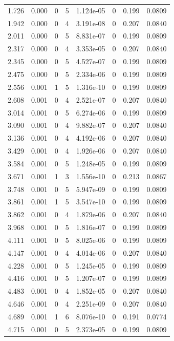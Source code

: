 \documentclass[preview]{standalone}
\begin{document}
{{\begin{tabular}{L{1.2cm}C{1.2cm} C{0.3cm}C{0.5cm} C{1.4cm}C{1.4cm} C{1.4cm}C{1.4cm}}
  1.726  &  0.000  & 0     &  5 &  1.124e-05  & 0  & 0.199 &  0.0809   \\ 
  1.942  &  0.000  & 0     &  4 &  3.191e-08  & 0  & 0.207 &  0.0840   \\ 
  2.011  &  0.000  & 0     &  5 &  8.831e-07  & 0  & 0.199 &  0.0809   \\ 
  2.317  &  0.000  & 0     &  4 &  3.353e-05  & 0  & 0.207 &  0.0840   \\ 
  2.345  &  0.000  & 0     &  5 &  4.527e-07  & 0  & 0.199 &  0.0809   \\ 
  2.475  &  0.000  & 0     &  5 &  2.334e-06  & 0  & 0.199 &  0.0809   \\ 
  2.556  &  0.001  & 1     &  5 &  1.316e-10  & 0  & 0.199 &  0.0809   \\ 
  2.608  &  0.001  & 0     &  4 &  2.521e-07  & 0  & 0.207 &  0.0840   \\ 
  3.014  &  0.001  & 0     &  5 &  6.274e-06  & 0  & 0.199 &  0.0809   \\ 
  3.090  &  0.001  & 0     &  4 &  9.882e-07  & 0  & 0.207 &  0.0840   \\ 
  3.136  &  0.001  & 0     &  4 &  4.192e-06  & 0  & 0.207 &  0.0840   \\ 
  3.429  &  0.001  & 0     &  4 &  1.926e-06  & 0  & 0.207 &  0.0840   \\ 
  3.584  &  0.001  & 0     &  5 &  1.248e-05  & 0  & 0.199 &  0.0809   \\ 
  3.671  &  0.001  & 1     &  3 &  1.556e-10  & 0  & 0.213 &  0.0867   \\ 
  3.748  &  0.001  & 0     &  5 &  5.947e-09  & 0  & 0.199 &  0.0809   \\ 
  3.861  &  0.001  & 1     &  5 &  3.547e-10  & 0  & 0.199 &  0.0809   \\ 
  3.862  &  0.001  & 0     &  4 &  1.879e-06  & 0  & 0.207 &  0.0840   \\ 
  3.968  &  0.001  & 0     &  5 &  1.816e-07  & 0  & 0.199 &  0.0809   \\ 
  4.111  &  0.001  & 0     &  5 &  8.025e-06  & 0  & 0.199 &  0.0809   \\ 
  4.147  &  0.001  & 0     &  4 &  4.014e-06  & 0  & 0.207 &  0.0840   \\ 
  4.228  &  0.001  & 0     &  5 &  1.245e-05  & 0  & 0.199 &  0.0809   \\ 
  4.416  &  0.001  & 0     &  5 &  1.207e-07  & 0  & 0.199 &  0.0809   \\ 
  4.483  &  0.001  & 0     &  4 &  1.852e-05  & 0  & 0.207 &  0.0840   \\ 
  4.646  &  0.001  & 0     &  4 &  2.251e-09  & 0  & 0.207 &  0.0840   \\ 
  4.689  &  0.001  & 1     &  6 &  8.076e-10  & 0  & 0.191 &  0.0774   \\ 
  4.715  &  0.001  & 0     &  5 &  2.373e-05  & 0  & 0.199 &  0.0809   \\ 
\hline 
\end{tabular} 

}}
\end{document}
